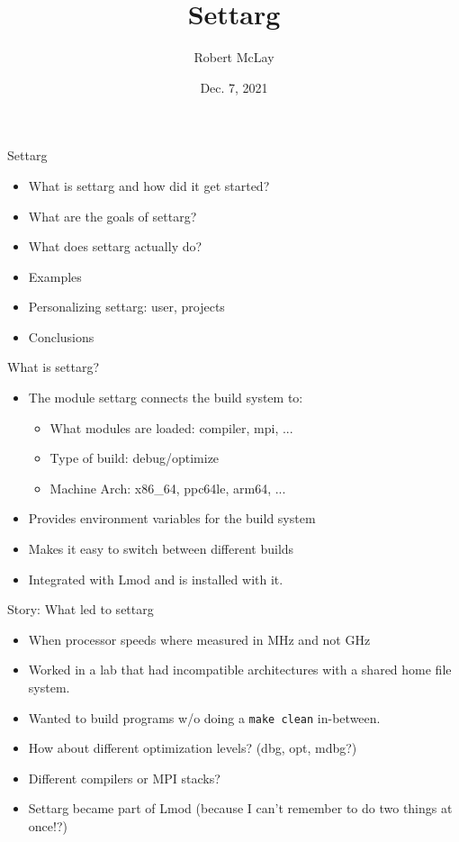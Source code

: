 \documentclass{beamer}
\begin{document}
\title[Lmod]{Settarg}
\author{Robert McLay} 
\date{Dec. 7, 2021}

\frame{\titlepage} 

\begin{frame}{Settarg}
  \begin{itemize}
    \item What is settarg and how did it get started?
    \item What are the goals of settarg?
    \item What does settarg actually do?
    \item Examples
    \item Personalizing settarg: user, projects
    \item Conclusions
  \end{itemize}
\end{frame}

\begin{frame}{What is settarg?}
  \begin{itemize}
    \item The module settarg connects the build system to:
      \begin{itemize}
        \item What modules are loaded: compiler, mpi, ...
        \item Type of build: debug/optimize
        \item Machine Arch: x86\_64, ppc64le, arm64, ...
      \end{itemize}
    \item Provides environment variables for the build system
    \item Makes it easy to switch between different builds
    \item Integrated with Lmod and is installed with it.
  \end{itemize}
\end{frame}

\begin{frame}{Story: What led to settarg}
  \begin{itemize}
    \item When processor speeds where measured in MHz and not GHz
    \item Worked in a lab that had incompatible architectures with a
      shared home file system.
    \item Wanted to build programs w/o doing a {\color{blue}\texttt{make
          clean}} in-between.
    \item How about different optimization levels? (dbg, opt, mdbg?)
    \item Different compilers or MPI stacks?
    \item Settarg became part of Lmod (because I can't remember to do
      two things at once!?)
  \end{itemize}
\end{frame}
\end{document}
